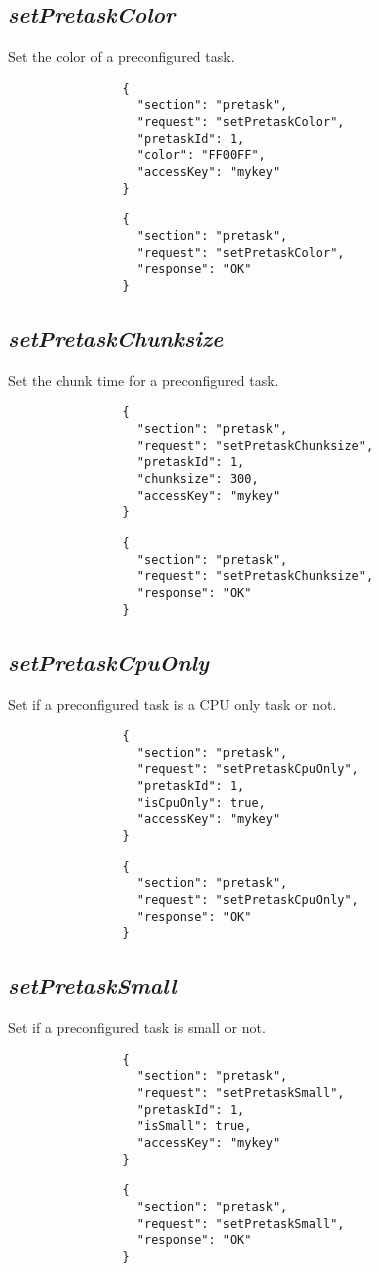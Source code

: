 		\subsection*{\textit{setPretaskColor}}
			Set the color of a preconfigured task.
			{
				\color{blue}
				\begin{verbatim}
				{
				  "section": "pretask",
				  "request": "setPretaskColor",
				  "pretaskId": 1,
				  "color": "FF00FF",
				  "accessKey": "mykey"
				}
				\end{verbatim}
			}
			{
				\color{OliveGreen}
				\begin{verbatim}
				{
				  "section": "pretask",
				  "request": "setPretaskColor",
				  "response": "OK"
				}
				\end{verbatim}
			}
		\subsection*{\textit{setPretaskChunksize}}
			Set the chunk time for a preconfigured task.
			{
				\color{blue}
				\begin{verbatim}
				{
				  "section": "pretask",
				  "request": "setPretaskChunksize",
				  "pretaskId": 1,
				  "chunksize": 300,
				  "accessKey": "mykey"
				}
				\end{verbatim}
			}
			{
				\color{OliveGreen}
				\begin{verbatim}
				{
				  "section": "pretask",
				  "request": "setPretaskChunksize",
				  "response": "OK"
				}
				\end{verbatim}
			}
		\subsection*{\textit{setPretaskCpuOnly}}
			Set if a preconfigured task is a CPU only task or not.
			{
				\color{blue}
				\begin{verbatim}
				{
				  "section": "pretask",
				  "request": "setPretaskCpuOnly",
				  "pretaskId": 1,
				  "isCpuOnly": true,
				  "accessKey": "mykey"
				}
				\end{verbatim}
			}
			{
				\color{OliveGreen}
				\begin{verbatim}
				{
				  "section": "pretask",
				  "request": "setPretaskCpuOnly",
				  "response": "OK"
				}
				\end{verbatim}
			}
		\subsection*{\textit{setPretaskSmall}}
			Set if a preconfigured task is small or not.
			{
				\color{blue}
				\begin{verbatim}
				{
				  "section": "pretask",
				  "request": "setPretaskSmall",
				  "pretaskId": 1,
				  "isSmall": true,
				  "accessKey": "mykey"
				}
				\end{verbatim}
			}
			{
				\color{OliveGreen}
				\begin{verbatim}
				{
				  "section": "pretask",
				  "request": "setPretaskSmall",
				  "response": "OK"
				}
				\end{verbatim}
			}
